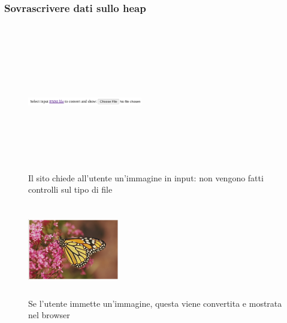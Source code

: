 \documentclass{beamer}
\newcommand\Fontvi{\fontsize{9.5}{7.2}\selectfont}
\begin{document}
\begin{frame}
  \frametitle{Sovrascrivere dati sullo heap}
  \Fontvi 
  \begin{columns}
    \begin{column}{0.5\textwidth}
      \begin{figure}
        \includegraphics[width=5cm,height=6cm,keepaspectratio]{images/site.png}
        \caption{Il sito chiede all'utente un'immagine in input: non vengono
        fatti controlli sul tipo di file} 
      \end{figure} 
      \begin{figure}
        \includegraphics[width=4cm,height=4cm,keepaspectratio]{images/butfly.png}
        \caption{Se l'utente immette un'immagine, questa viene convertita
        e mostrata nel browser} 
      \end{figure} 


\end{column}
\end{columns}
\end{frame}
\end{document}

